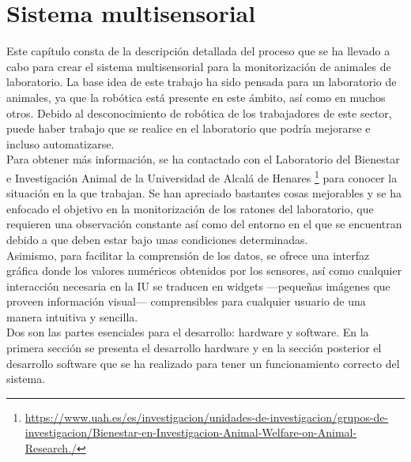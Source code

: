 \chapter{Sistema multisensorial }
\label{cap:capitulo4}



\vspace{1cm}
Este capítulo consta de la descripción detallada del proceso que se ha llevado a cabo para crear el sistema multisensorial para la monitorización de animales de laboratorio. La base idea de este trabajo ha sido pensada para un laboratorio de animales, ya que la robótica está presente en este ámbito, así como en muchos otros. Debido al desconocimiento de robótica de los trabajadores de este sector, puede haber trabajo que se realice en el laboratorio que podría mejorarse e incluso automatizarse.\\

Para obtener más información, se ha contactado con el Laboratorio del Bienestar e Investigación Animal de la Universidad de Alcalá de Henares \footnote{\url{https://www.uah.es/es/investigacion/unidades-de-investigacion/grupos-de-investigacion/Bienestar-en-Investigacion-Animal-Welfare-on-Animal-Research./}} para conocer la situación en la que trabajan. Se han apreciado bastantes cosas mejorables y se ha enfocado el objetivo en la monitorización de los ratones del laboratorio, que requieren una observación constante así como del entorno en el que se encuentran debido a que deben estar bajo unas condiciones determinadas.\\

Asimismo, para facilitar la comprensión de los datos, se ofrece una interfaz gráfica donde los valores numéricos obtenidos por los sensores, así como cualquier interacción necesaria en la IU se traducen en widgets ---pequeñas imágenes que proveen información visual--- comprensibles para cualquier usuario de una manera intuitiva y sencilla.\\

Dos son las partes esenciales para el desarrollo: hardware y software. En la primera sección se presenta el desarrollo hardware y en la sección posterior el desarrollo software que se ha realizado para tener un funcionamiento correcto del sistema.

